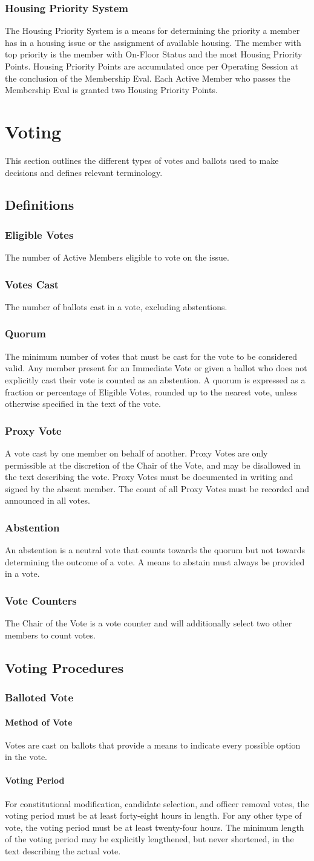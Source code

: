 \documentclass{article}
\newcommand{\article}[1]{\section{#1} \label{#1}}
\newcommand{\asection}[1]{\subsection{#1} \label{#1}}
\newcommand{\asubsection}[1]{\subsubsection{#1} \label{#1}}
\newcommand{\asubsubsection}[1]{\paragraph{#1} \label{#1}}
\begin{document}
\asubsection{Housing Priority System}
The Housing Priority System is a means for determining the priority a member has in a housing issue or the assignment of available housing.
The member with top priority is the member with On-Floor Status and the most Housing Priority Points.
Housing Priority Points are accumulated once per Operating Session at the conclusion of the Membership Eval. Each Active Member who passes the Membership Eval is granted two Housing Priority Points.

\article{Voting}
This section outlines the different types of votes and ballots used to make decisions and defines relevant terminology.

\asection{Definitions}

\asubsection{Eligible Votes}
The number of Active Members eligible to vote on the issue.

\asubsection{Votes Cast}
The number of ballots cast in a vote, excluding abstentions.

\asubsection{Quorum}
The minimum number of votes that must be cast for the vote to be considered valid.
Any member present for an Immediate Vote or given a ballot who does not explicitly cast their vote is counted as an abstention.
A quorum is expressed as a fraction or percentage of Eligible Votes, rounded up to the nearest vote, unless otherwise specified in the text of the vote.

\asubsection{Proxy Vote}
A vote cast by one member on behalf of another.
Proxy Votes are only permissible at the discretion of the Chair of the Vote, and may be disallowed in the text describing the vote.
Proxy Votes must be documented in writing and signed by the absent member.
The count of all Proxy Votes must be recorded and announced in all votes.

\asubsection{Abstention}
An abstention is a neutral vote that counts towards the quorum but not towards determining the outcome of a vote.
A means to abstain must always be provided in a vote.

\asubsection{Vote Counters}
The Chair of the Vote is a vote counter and will additionally select two other members to count votes.

\asection{Voting Procedures}

\asubsection{Balloted Vote}

\asubsubsection{Method of Vote}
Votes are cast on ballots that provide a means to indicate every possible option in the vote.

\asubsubsection{Voting Period}
For constitutional modification, candidate selection, and officer removal votes, the voting period must be at least forty-eight hours in length.
For any other type of vote, the voting period must be at least twenty-four hours.
The minimum length of the voting period may be explicitly lengthened, but never shortened, in the text describing the actual vote.
\end{document}
